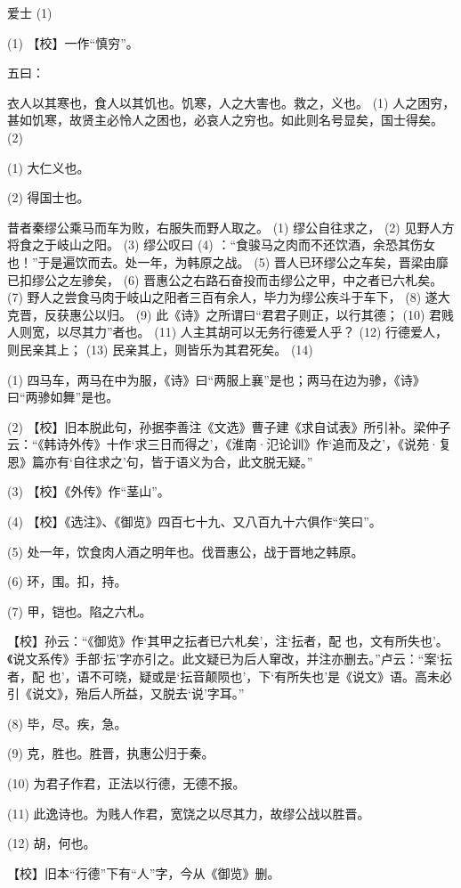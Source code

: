 \documentclass[12pt,UTF8]{ctexbook}
\begin{document}
爱士 (1)


(1) 【校】一作“慎穷”。

五曰：

衣人以其寒也，食人以其饥也。饥寒，人之大害也。救之，义也。 (1) 人之困穷，甚如饥寒，故贤主必怜人之困也，必哀人之穷也。如此则名号显矣，国士得矣。 (2)

(1) 大仁义也。

(2) 得国士也。

昔者秦缪公乘马而车为败，右服失而野人取之。 (1) 缪公自往求之， (2) 见野人方将食之于岐山之阳。 (3) 缪公叹曰 (4) ：“食骏马之肉而不还饮酒，余恐其伤女也！”于是遍饮而去。处一年，为韩原之战。 (5) 晋人已环缪公之车矣，晋梁由靡已扣缪公之左骖矣， (6) 晋惠公之右路石奋投而击缪公之甲，中之者已六札矣。 (7) 野人之尝食马肉于岐山之阳者三百有余人，毕力为缪公疾斗于车下， (8) 遂大克晋，反获惠公以归。 (9) 此《诗》之所谓曰“君君子则正，以行其德； (10) 君贱人则宽，以尽其力”者也。 (11) 人主其胡可以无务行德爱人乎？ (12) 行德爱人，则民亲其上； (13) 民亲其上，则皆乐为其君死矣。 (14)

(1) 四马车，两马在中为服，《诗》曰“两服上襄”是也；两马在边为骖，《诗》曰“两骖如舞”是也。

(2) 【校】旧本脱此句，孙据李善注《文选》曹子建《求自试表》所引补。梁仲子云：“《韩诗外传》十作‘求三日而得之’，《淮南·氾论训》作‘追而及之’，《说苑·复恩》篇亦有‘自往求之’句，皆于语义为合，此文脱无疑。”

(3) 【校】《外传》作“茎山”。

(4) 【校】《选注》、《御览》四百七十九、又八百九十六俱作“笑曰”。

(5) 处一年，饮食肉人酒之明年也。伐晋惠公，战于晋地之韩原。

(6) 环，围。扣，持。

(7) 甲，铠也。陷之六札。

【校】孙云：“《御览》作‘其甲之抎者已六札矣’，注‘抎者，配 也，文有所失也’。《说文系传》手部‘抎’字亦引之。此文疑已为后人窜改，并注亦删去。”卢云：“案‘抎者，配 也’，语不可晓，疑或是‘抎音颠陨也’，下‘有所失也’是《说文》语。高未必引《说文》，殆后人所益，又脱去‘说’字耳。”

(8) 毕，尽。疾，急。

(9) 克，胜也。胜晋，执惠公归于秦。

(10) 为君子作君，正法以行德，无德不报。

(11) 此逸诗也。为贱人作君，宽饶之以尽其力，故缪公战以胜晋。

(12) 胡，何也。

【校】旧本“行德”下有“人”字，今从《御览》删。
\end{document}
